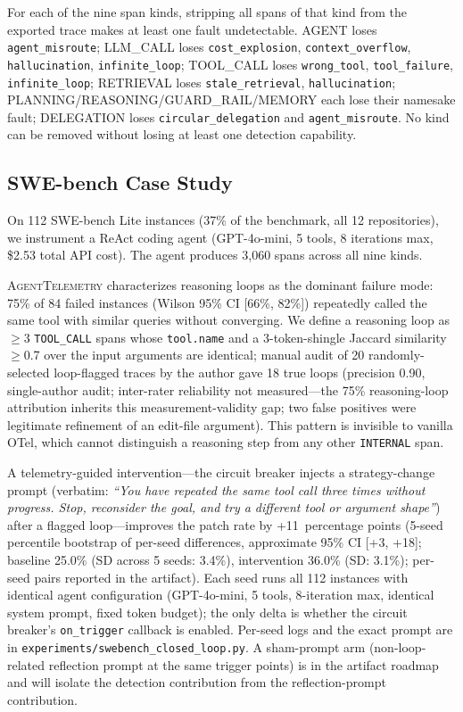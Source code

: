 \documentclass[sigconf,review]{acmart}
\begin{document}
For each of the nine span kinds, stripping all spans of that kind from
the exported trace makes at least one fault undetectable.  AGENT loses
\texttt{agent\_misroute}; LLM\_CALL loses \texttt{cost\_explosion},
\texttt{context\_overflow}, \texttt{hallucination}, \texttt{infinite\_loop};
TOOL\_CALL loses \texttt{wrong\_tool}, \texttt{tool\_failure},
\texttt{infinite\_loop}; RETRIEVAL loses \texttt{stale\_retrieval},
\texttt{hallucination}; PLANNING/REASONING/GUARD\_RAIL/MEMORY each lose
their namesake fault; DELEGATION loses \texttt{circular\_delegation}
and \texttt{agent\_misroute}.  No kind can be removed without losing
at least one detection capability.

\subsection{SWE-bench Case Study}

On 112 SWE-bench Lite instances (37\% of the benchmark, all 12
repositories), we instrument a ReAct coding agent (GPT-4o-mini, 5
tools, 8 iterations max, \$2.53 total API cost).  The agent produces
3,060 spans across all nine kinds.

\textsc{AgentTelemetry} characterizes reasoning loops as the dominant
failure mode: 75\% of 84 failed instances (Wilson 95\% CI [66\%, 82\%])
repeatedly called the same tool with similar queries without
converging.  We define a reasoning loop as $\geq$3 \texttt{TOOL\_CALL}
spans whose \texttt{tool.name} and a 3-token-shingle Jaccard
similarity~$\geq$0.7 over the input arguments are identical; manual
audit of 20 randomly-selected loop-flagged traces by the author gave
18 true loops (precision 0.90, single-author audit; inter-rater
reliability not measured---the 75\% reasoning-loop attribution
inherits this measurement-validity gap; two false positives were
legitimate refinement of an
edit-file argument).  This pattern is invisible to vanilla OTel, which
cannot distinguish a reasoning step from any other \texttt{INTERNAL}
span.

A telemetry-guided intervention---the circuit breaker injects a
strategy-change prompt (verbatim: \emph{``You have repeated the same
tool call three times without progress.  Stop, reconsider the goal,
and try a different tool or argument shape''}) after a flagged
loop---improves the patch rate by +11~percentage points (5-seed
percentile bootstrap of per-seed differences, approximate 95\% CI
[+3, +18]; baseline 25.0\% (SD across 5 seeds: 3.4\%), intervention
36.0\% (SD: 3.1\%); per-seed pairs reported in the artifact).  Each
seed runs all 112 instances with identical agent configuration
(GPT-4o-mini, 5 tools, 8-iteration max, identical
system prompt, fixed token budget); the only delta is whether the
circuit breaker's \texttt{on\_trigger} callback is enabled.  Per-seed
logs and the exact prompt are in
\texttt{experiments/swebench\_closed\_loop.py}.
A sham-prompt arm (non-loop-related reflection prompt at the same
trigger points) is in the artifact roadmap and will isolate the
detection contribution from the reflection-prompt contribution.
\end{document}
